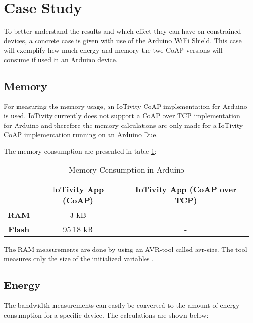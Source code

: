 \section{Case Study} \label{sec:casestudy}
To better understand the results and which effect they can have on constrained devices, a concrete case is given with use of the Arduino WiFi Shield. This case will exemplify how much energy and memory the two CoAP versions will consume if used in an Arduino device.

\subsection{Memory}
For measuring the memory usage, an IoTivity CoAP implementation for Arduino is used. IoTivity currently does not support a CoAP over TCP implementation for Arduino and therefore the memory calculations are only made for a IoTivity CoAP implementation running on an Arduino Due.
 
The memory consumption are presented in table \ref{tab:memory}:
\begin{table}[bht]
	\renewcommand{\arraystretch}{1.3}
	\caption{Memory Consumption in Arduino}
	\label{tab:memory}
	\centering
	\begin{tabular}{|c|c|c|}
		\hline
		\bfseries  & \bfseries IoTivity App (CoAP) & \bfseries IoTivity App (CoAP over TCP) \\
		\hline
		\textbf{RAM} & 3 kB & - \\
		\hline
		\textbf{Flash} & 95.18 kB & - \\
		\hline
	\end{tabular}
\end{table}

The RAM measurements are done by using an AVR-tool called avr-size. The tool measures only the size of the initialized variables \cite{Check55:online}.

\subsection{Energy}
The bandwidth measurements can easily be converted to the amount of energy consumption for a specific device. The calculations are shown below:


